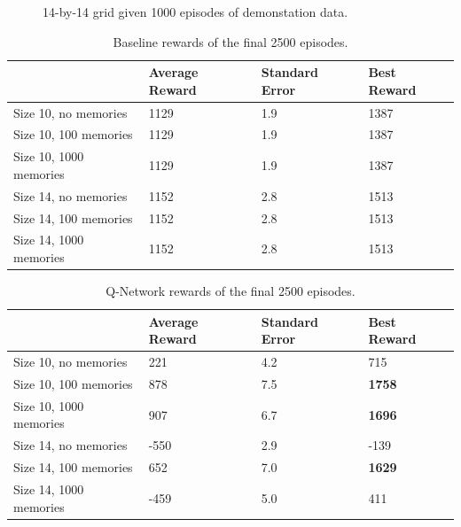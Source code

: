 \begin{figure}[H]
    \caption{14-by-14 grid given 1000 episodes of demonstation data.}
    \label{fig:14sized-1000mem}
\end{figure}


\begin{table}[H]
\begin{tabular}{l|l|l|l|}
\cline{2-4}
\textbf{} & Average Reward & Standard Error & Best Reward \\ \hline
\multicolumn{1}{|l|}{Size 10, no memories} & 1129 & 1.9 & 1387 \\ \hline
\multicolumn{1}{|l|}{Size 10, 100 memories} & 1129 & 1.9 & 1387 \\ \hline
\multicolumn{1}{|l|}{Size 10, 1000 memories} & 1129 & 1.9 & 1387 \\ \hline
\multicolumn{1}{|l|}{Size 14, no memories} & 1152 & 2.8 & 1513 \\ \hline
\multicolumn{1}{|l|}{Size 14, 100 memories} & 1152 & 2.8 & 1513 \\ \hline
\multicolumn{1}{|l|}{Size 14, 1000 memories} & 1152 & 2.8 & 1513 \\ \hline
\end{tabular}
\caption{Baseline rewards of the final 2500 episodes.}
\label{tab:2500base}
\end{table}
\begin{table}[H]
\begin{tabular}{l|l|l|l|}
\cline{2-4}
\textbf{} & Average Reward & Standard Error & Best Reward \\ \hline
\multicolumn{1}{|l|}{Size 10, no memories} & 221 & 4.2 & 715 \\ \hline
\multicolumn{1}{|l|}{Size 10, 100 memories} & 878 & 7.5 & \textbf{1758} \\ \hline
\multicolumn{1}{|l|}{Size 10, 1000 memories} & 907 & 6.7 & \textbf{1696} \\ \hline
\multicolumn{1}{|l|}{Size 14, no memories} & -550 & 2.9 & -139 \\ \hline
\multicolumn{1}{|l|}{Size 14, 100 memories} & 652 & 7.0 & \textbf{1629} \\ \hline
\multicolumn{1}{|l|}{Size 14, 1000 memories} & -459 & 5.0 & 411 \\ \hline
\end{tabular}
\caption{Q-Network rewards of the final 2500 episodes.}
\label{tab:2500qnet}
\end{table}
